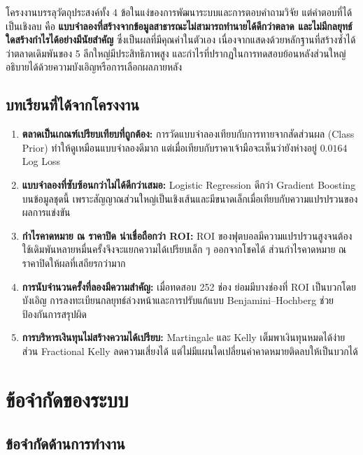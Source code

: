 โครงงานบรรลุวัตถุประสงค์ทั้ง 4 ข้อในแง่ของการพัฒนาระบบและการตอบคำถามวิจัย แต่คำตอบที่ได้เป็นเชิงลบ คือ \textbf{แบบจำลองที่สร้างจากข้อมูลสาธารณะไม่สามารถทำนายได้ดีกว่าตลาด และไม่มีกลยุทธ์ใดสร้างกำไรได้อย่างมีนัยสำคัญ} ซึ่งเป็นผลที่มีคุณค่าในตัวเอง เนื่องจากแสดงด้วยหลักฐานที่สร้างซ้ำได้ว่าตลาดเดิมพันของ 5 ลีกใหญ่มีประสิทธิภาพสูง และกำไรที่ปรากฏในการทดสอบย้อนหลังส่วนใหญ่อธิบายได้ด้วยความบังเอิญหรือการเลือกผลภายหลัง

\subsection{บทเรียนที่ได้จากโครงงาน}

\begin{enumerate}[label=\arabic*)]
    \item \textbf{ตลาดเป็นเกณฑ์เปรียบเทียบที่ถูกต้อง:} การวัดแบบจำลองเทียบกับการทายจากสัดส่วนผล (Class Prior) ทำให้ดูเหมือนแบบจำลองดีมาก แต่เมื่อเทียบกับราคาเจ้ามือจะเห็นว่ายังห่างอยู่ $0.0164$ Log Loss
    \item \textbf{แบบจำลองที่ซับซ้อนกว่าไม่ได้ดีกว่าเสมอ:} Logistic Regression ดีกว่า Gradient Boosting บนข้อมูลชุดนี้ เพราะสัญญาณส่วนใหญ่เป็นเชิงเส้นและมีขนาดเล็กเมื่อเทียบกับความแปรปรวนของผลการแข่งขัน
    \item \textbf{กำไรคาดหมาย ณ ราคาปิด น่าเชื่อถือกว่า ROI:} ROI ของฟุตบอลมีความแปรปรวนสูงจนต้องใช้เดิมพันหลายหมื่นครั้งจึงจะแยกความได้เปรียบเล็ก ๆ ออกจากโชคได้ ส่วนกำไรคาดหมาย ณ ราคาปิดให้ผลที่เสถียรกว่ามาก
    \item \textbf{การนับจำนวนครั้งที่ลองมีความสำคัญ:} เมื่อทดสอบ 252 ช่อง ย่อมมีบางช่องที่ ROI เป็นบวกโดยบังเอิญ การลงทะเบียนกลยุทธ์ล่วงหน้าและการปรับแก้แบบ Benjamini--Hochberg ช่วยป้องกันการสรุปผิด
    \item \textbf{การบริหารเงินทุนไม่สร้างความได้เปรียบ:} Martingale และ Kelly เต็มพาเงินทุนหมดได้ง่าย ส่วน Fractional Kelly ลดความเสี่ยงได้ แต่ไม่มีแผนใดเปลี่ยนค่าคาดหมายติดลบให้เป็นบวกได้
\end{enumerate}

\section{ข้อจำกัดของระบบ}

\subsection{ข้อจำกัดด้านการทำงาน}

